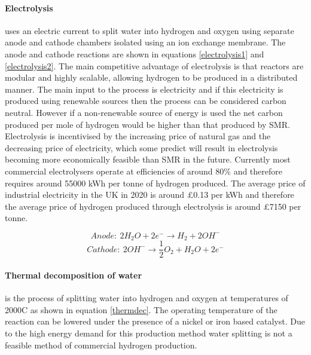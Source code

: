 \paragraph{Electrolysis} uses an electric current to split water into hydrogen and oxygen using separate anode and cathode chambers isolated using an ion exchange membrane. The anode and cathode reactions are shown in equations \ref{electrolysis1} and \ref{electrolysis2}. The main competitive advantage of electrolysis is that reactors are modular and highly scalable, allowing hydrogen to be produced in a distributed manner. \cite{Acar2014} The main input to the process is electricity and if this electricity is produced using renewable sources then the process can be considered carbon neutral. However if a non-renewable source of energy is used the net carbon produced per mole of hydrogen would be higher than that produced by SMR. \cite{Koroneos2004}
Electrolysis is incentivised by the increasing price of natural gas and the decreasing price of electricity, which some predict will result in electrolysis becoming more economically feasible than SMR in the future. \cite{Acar2014} Currently most commercial electrolysers operate at efficiencies of around 80\% and therefore requires around 55000 kWh per tonne of hydrogen produced. The average price of industrial electricity in the UK in 2020 is around £0.13 per kWh \cite{departmentforbusinessenergyindustrialstrategy_2020} and therefore the average price of hydrogen produced through electrolysis is around £7150 per tonne. \cite{hydrogencouncil_2020}


\begin{equation}\label{electrolysis1}
Anode: \: 2H_2 O +  2e^- \rightarrow H_2 + 2OH^-
\end{equation}
\begin{equation}\label{electrolysis2}
Cathode: \: 2OH^- \rightarrow \frac{1}{2}O_2+ H_2 O + 2e^-
\end{equation}

\paragraph{Thermal decomposition of water} is the process of splitting water into hydrogen and oxygen at temperatures of 2000\textdegree C as shown in equation \ref{thermdec}. \cite{Holladay2009} The operating temperature of the reaction can be lowered under the presence of a nickel or iron based catalyst. \cite{Holladay2009} Due to the high energy demand for this production method water splitting is not a feasible method of commercial hydrogen production.


